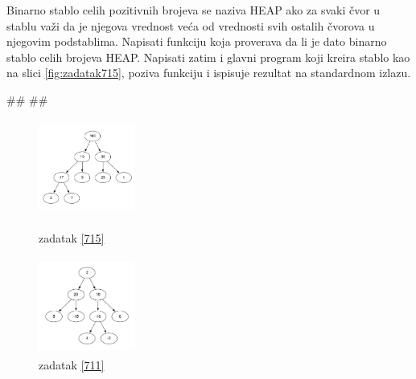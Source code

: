 \begin{Answer}[ref=714]
\end{Answer}


\begin{Exercise}[label=715]
Binarno stablo celih pozitivnih brojeva se naziva HEAP ako za svaki čvor u stablu važi da je njegova vrednost veća od vrednosti svih ostalih čvorova u njegovim podstablima. Napisati funkciju  koja proverava da li je dato binarno stablo celih brojeva HEAP. Napisati zatim i glavni program koji kreira stablo kao na slici \ref{fig:zadatak715}, poziva funkciju  i ispisuje rezultat na standardnom izlazu. 
\begin{miditest}
\begin{test}{1}
#\naslovIzlaz#
##
\end{test}
\end{miditest}

\end{Exercise}

\begin{Answer}[ref=715]
\end{Answer}

\begin{figure}[!htb]

\includegraphics[height=120px,width=120px]{poglavlja/slike/heap.png}
\caption{zadatak \ref{715}}
\label{fig:zadatak715}
\endminipage\hfill
{}
\includegraphics[height=120px,width=120px]{poglavlja/slike/binarna_stabla.png}
\caption{zadatak \ref{711}}
\label{fig:zadatak711}
\endminipage\hfill

\end{figure}


